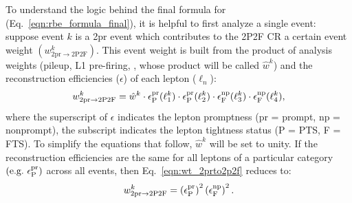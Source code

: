 To understand the logic behind the final formula for \fourPexp (Eq.~\ref{eqn:rbe_formula_final}), it is helpful to first analyze a single event:
suppose event $k$ is a 2pr event which contributes to the 2P2F CR a certain event weight $\left( w^{k}_{\mathrm{2pr \to 2P2F}} \right)$.
This event weight is built from the product of analysis weights (pileup, L1 pre-firing, \etc, whose product will be called $\hat{w}^k$) and the reconstruction efficiencies ($\epsilon$) of each lepton ($\ell_n$):
\begin{equation}
	\label{eqn:wt_2prto2p2f}
	w^{k}_{\mathrm{2pr \to 2P2F}} = \hat{w}^k \cdot \epsilon^{\mathrm{pr}}_\mathrm{P}(\ell_1^k) \cdot \epsilon^{\mathrm{pr}}_\mathrm{P}(\ell_2^k) \cdot \epsilon^{\mathrm{np}}_\mathrm{F}(\ell_3^k) \cdot \epsilon^{\mathrm{np}}_\mathrm{F}(\ell_4^k),
\end{equation}
where the superscript of $\epsilon$ indicates the lepton promptness (pr = prompt, np = nonprompt),
the subscript indicates the lepton tightness status (P = PTS, F = FTS).
To simplify the equations that follow, $\hat{w}^k$ will be set to unity.
If the reconstruction efficiencies are the same for all leptons of a particular category $\left( \mbox{e.g.} ~ \epsilon^{\mathrm{pr}}_\mathrm{P} \right)$ across all events, then Eq.~\ref{eqn:wt_2prto2p2f} reduces to:
\begin{equation}
	\label{eqn:wt_2prto2p2f_simp}
	w^{k}_{\mathrm{2pr \to 2P2F}} = 
	\left( \epsilon^{\mathrm{pr}}_\mathrm{P} \right)^2 
	\left( \epsilon^{\mathrm{np}}_\mathrm{F} \right)^2.
\end{equation}

